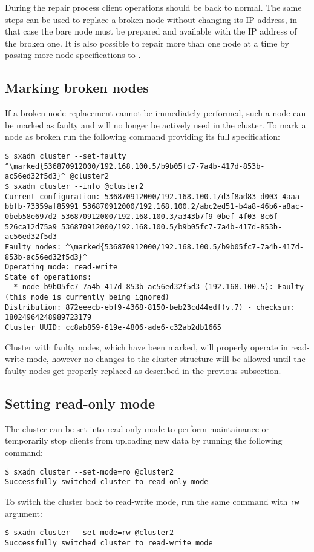 During the repair process client operations should be back to normal. The same
steps can be used to replace a broken node without changing its IP address, in
that case the bare node must be prepared and available with the IP address of
the broken one. It is also possible to repair more than one node at a time by
passing more node specifications to .

\subsection{Marking broken nodes}
If a broken node replacement cannot be immediately performed, such a node can be
marked as faulty and will no longer be actively used in the cluster. To mark
a node as broken run the following command providing its full specification:
\begin{lstlisting}
$ sxadm cluster --set-faulty ^\marked{536870912000/192.168.100.5/b9b05fc7-7a4b-417d-853b-ac56ed32f5d3}^ @cluster2
$ sxadm cluster --info @cluster2
Current configuration: 536870912000/192.168.100.1/d3f8ad83-d003-4aaa-bbfb-73359af85991 536870912000/192.168.100.2/abc2ed51-b4a8-46b6-a8ac-0beb58e697d2 536870912000/192.168.100.3/a343b7f9-0bef-4f03-8c6f-526ca12d75a9 536870912000/192.168.100.5/b9b05fc7-7a4b-417d-853b-ac56ed32f5d3
Faulty nodes: ^\marked{536870912000/192.168.100.5/b9b05fc7-7a4b-417d-853b-ac56ed32f5d3}^
Operating mode: read-write
State of operations:
  * node b9b05fc7-7a4b-417d-853b-ac56ed32f5d3 (192.168.100.5): Faulty (this node is currently being ignored)
Distribution: 872eeecb-ebf9-4368-8150-beb23cd44edf(v.7) - checksum: 18024964248989723179
Cluster UUID: cc8ab859-619e-4806-ade6-c32ab2db1665
\end{lstlisting}
Cluster with faulty nodes, which have been marked, will properly operate in
read-write mode, however no changes to the cluster structure will be allowed
until the faulty nodes get properly replaced as described in the previous
subsection.

\subsection{Setting read-only mode}
The cluster can be set into read-only mode to perform maintainance or
temporarily stop clients from uploading new data by running the following
command:
\begin{lstlisting}
$ sxadm cluster --set-mode=ro @cluster2
Successfully switched cluster to read-only mode
\end{lstlisting}
To switch the cluster back to read-write mode, run the same command with
\verb+rw+ argument:
\begin{lstlisting}
$ sxadm cluster --set-mode=rw @cluster2
Successfully switched cluster to read-write mode
\end{lstlisting}


